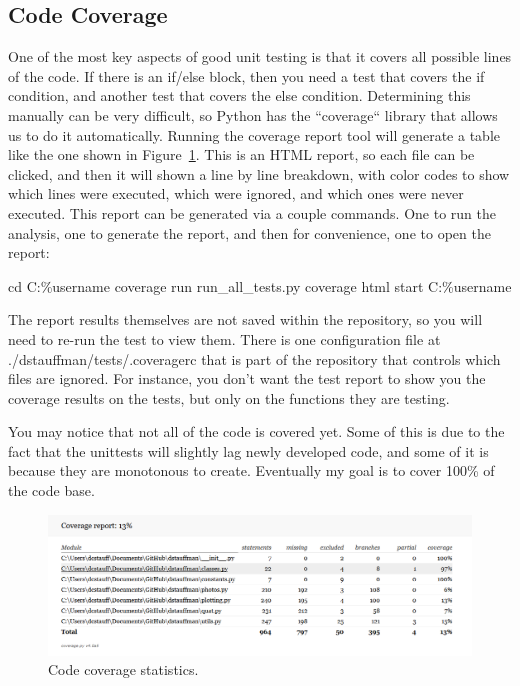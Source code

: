 \documentclass[12pt]{article}
\begin{document}
\subsection{Code Coverage}\label{h2:Code_coverage}
One of the most key aspects of good unit testing is that it covers all possible lines of the code.  If there is an if/else block, then you need a test that covers the if condition, and another test that covers the else condition.  Determining this manually can be very difficult, so Python has the ``coverage`` library that allows us to do it automatically.  Running the coverage report tool will generate a table like the one shown in Figure~\ref{fig:code_coverage}.  This is an HTML report, so each file can be clicked, and then it will shown a line by line breakdown, with color codes to show which lines were executed, which were ignored, and which ones were never executed.  This report can be generated via a couple commands.  One to run the analysis, one to generate the report, and then for convenience, one to open the report:
\begin{PlainText}
cd C:\Users\%username%
coverage run run_all_tests.py
coverage html
start C:\Users\%username%
\end{PlainText}

The report results themselves are not saved within the repository, so you will need to re-run the test to view them.  There is one configuration file at ./dstauffman/tests/.coveragerc that is part of the repository that controls which files are ignored.  For instance, you don't want the test report to show you the coverage results on the tests, but only on the functions they are testing.

You may notice that not all of the code is covered yet.  Some of this is due to the fact that the unittests will slightly lag newly developed code, and some of it is because they are monotonous to create.  Eventually my goal is to cover 100\% of the code base.

\begin{figure}[H]
    \centering
    \includegraphics[width=\textwidth]{Coverage.png}
    \caption{Code coverage statistics.}
    \label{fig:code_coverage}
\end{figure}
\end{document}
